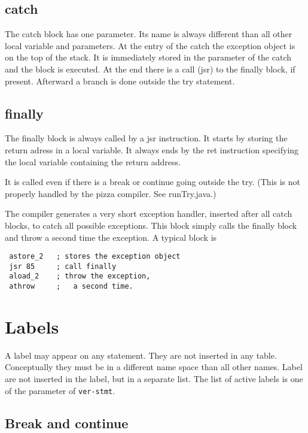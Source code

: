 \documentclass{book}
\newcommand{\func}[1]{\verb+#1+}
\begin{document}
\subsection{catch}

The catch block has one parameter. Its name is always different than
all other local variable and parameters. At the entry of the catch the
exception object is on the top of the stack. It is immediately stored
in the parameter of the catch and the block is executed. At the end
there is a call (jsr) to the finally block, if present. Afterward a
branch is done outside the try statement.

\subsection{finally}

The finally block is always called by a jsr instruction. It starts by
storing the return adress in a local variable. It always ends by the
ret instruction specifying the local variable containing the return
address. 

It is called even if there is a break or continue going outside the
try. (This is not properly handled by the pizza compiler. See
runTry.java.)

The compiler generates a very short exception handler, inserted after
all catch blocks, to catch all possible exceptions. This block simply
calls the finally block and throw a second time the exception. A
typical block is

\begin{verbatim}
 astore_2   ; stores the exception object
 jsr 85     ; call finally
 aload_2    ; throw the exception,
 athrow     ;   a second time.
\end{verbatim}

\section{Labels}

A label may appear on any statement. They are not inserted in any
table.  Conceptually they must be in a different name space than all
other names. Label are not inserted in the label, but in a separate
list.  The list of active labels is one of the parameter of
\func{ver-stmt}.

\subsection{Break and continue}
\end{document}
